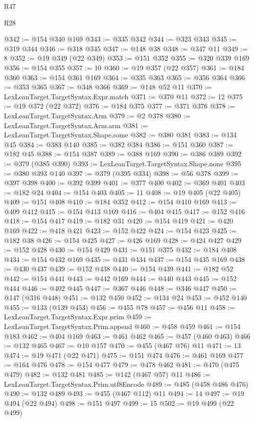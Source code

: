 \begin{lexlean}{R47}
\begin{lexlean}{R28}
\begin{coremodule}
{{{{{{{{{{{{{{{{{{{{{{{{{{{{{{{{{{{{{{{{{{{{{{{{{{{{{{{{{{{{{{{{{{{{{{{{{{{{{{{{{{{{{{{{{{{{{{{{{{{{{{{{{{{{{{{{{{{{{{{{{{{{{{{{{{{{{@342 := @154 @340 @169
@343 := @335 @342
@344 := @323 @343
@345 := @319 @344
@346 := @318 @345
@347 := @148 @38
@348 := @347 @11
@349 := 8
@352 := @19 @349 (@22 @349)
@353 := @151 @352
@355 := @320 @339 @169
@356 := @154 @355
@357 := 10
@360 := @19 @357 (@22 @357)
@361 := @184 @360
@363 := @154 @361 @169
@364 := @335 @363
@365 := @356 @364
@366 := @353 @365
@367 := @348 @366
@369 := @148 @52 @11
@370 := LexLeanTarget.TargetSyntax.Expr.match
@371 := @370 @11
@372 := 12
@375 := @19 @372 (@22 @372)
@376 := @184 @375
@377 := @371 @376
@378 := LexLeanTarget.TargetSyntax.Arm
@379 := @2 @378
@380 := LexLeanTarget.TargetSyntax.Arm.arm
@381 := LexLeanTarget.TargetSyntax.Shape.some
@382 := @380 @381
@383 := @134 @45
@384 := @383 @140
@385 := @382 @384
@386 := @151 @360
@387 := @182 @45
@388 := @154 @387
@389 := @388 @169
@390 := @386 @389
@392 := @379 (@385 @390)
@393 := LexLeanTarget.TargetSyntax.Shape.none
@395 := @380 @393 @140
@397 := @379 (@395 @334)
@398 := @56 @378
@399 := @397 @398
@400 := @392 @399
@401 := @377 @400
@402 := @369 @401
@403 := @182 @24
@404 := @154 @403
@405 := 11
@408 := @19 @405 (@22 @405)
@409 := @151 @408
@410 := @184 @352
@412 := @154 @410 @169
@413 := @409 @412
@415 := @154 @413 @169
@416 := @404 @415
@417 := @152 @416
@418 := @154 @417
@419 := @182 @31
@420 := @154 @419
@421 := @420 @169
@422 := @418 @421
@423 := @152 @422
@424 := @154 @423
@425 := @182 @38
@426 := @154 @425
@427 := @426 @169
@428 := @424 @427
@429 := @152 @428
@430 := @154 @429
@431 := @151 @375
@432 := @184 @408
@434 := @154 @432 @169
@435 := @431 @434
@437 := @154 @435 @169
@438 := @430 @437
@439 := @152 @438
@440 := @154 @439
@441 := @182 @52
@442 := @154 @441
@443 := @442 @169
@444 := @440 @443
@445 := @152 @444
@446 := @402 @445
@447 := @367 @446
@448 := @346 @447
@450 := @147 (@316 @448)
@451 := @132 @450
@452 := @134 @24
@453 := @452 @140
@455 := @133 (@139 @453)
@456 := @455 @78
@457 := @456 @11
@458 := LexLeanTarget.TargetSyntax.Expr.prim
@459 := LexLeanTarget.TargetSyntax.Prim.append
@460 := @458 @459
@461 := @154 @183
@462 := @404 @169
@463 := @461 @462
@465 := @457 (@460 @463)
@466 := @132 @465
@467 := @10 @157
@470 := @455 (@467 @76) @11
@471 := 13
@474 := @19 @471 (@22 @471)
@475 := @151 @474
@476 := @461 @169
@477 := @164 @476
@478 := @154 @477
@479 := @478 @462
@481 := @470 (@475 @479)
@482 := @132 @481
@485 := @142 (@467 @57) @11
@486 := LexLeanTarget.TargetSyntax.Prim.utf8Encode
@489 := @485 (@458 @486 @476)
@490 := @132 @489
@493 := @455 (@467 @112) @11
@494 := 14
@497 := @19 @494 (@22 @494)
@498 := @151 @497
@499 := 15
@502 := @19 @499 (@22 @499)
}}}}}}}}}}}}}}}}}}}}}}}}}}}}}}}}}}}}}}}}}}}}}}}}}}}}}}}}}}}}}}}}}}}}}}}}}}}}}}}}}}}}}}}}}}}}}}}}}}}}}}}}}}}}}}}}}}}}}}}}}}}}}}}}}}}}}
\end{coremodule}
\end{lexlean}
\end{lexlean}
